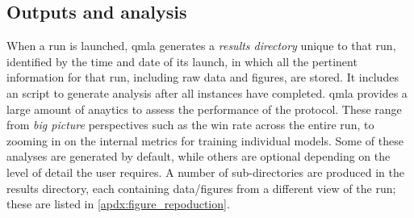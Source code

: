 \subsection{Outputs and analysis}\label{sec:qmla_outputs}
When a \gls{run} is launched, \gls{qmla} generates a \emph{\gls{results directory}} unique to that \gls{run}, 
    identified by the time and date of its launch,
    in which all the pertinent information for that \gls{run}, including raw data and figures, are stored. 
It includes an  script to generate analysis after all \glspl{instance} have completed\footnotemark. 
\gls{qmla} provides a large amount of anaytics to assess the performance of the protocol. 
These range from \emph{big picture} perspectives such as the  \gls{win rate}  across the entire \gls{run}, 
    to zooming in on the internal metrics for training individual models.
Some of these analyses are generated by default, while others are optional depending on the 
    level of detail the user requires. 
A number of sub-directories are produced in the \gls{results directory}, 
    each containing data/figures from a different view of the \gls{run};
    these are listed in \cref{apdx:figure_repoduction}.
\par 

